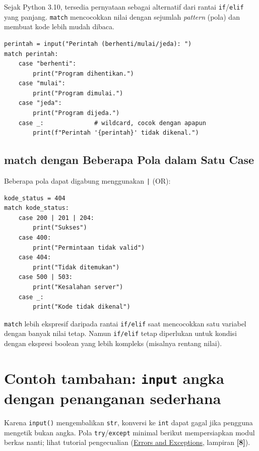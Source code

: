 ﻿\documentclass[../main.tex]{subfiles}
\begin{document}
Sejak Python 3.10, tersedia pernyataan  sebagai alternatif dari rantai \texttt{if}/\texttt{elif} yang panjang. \texttt{match} mencocokkan nilai dengan sejumlah \textit{pattern} (pola) dan membuat kode lebih mudah dibaca.

\begin{lstlisting}[caption=Pernyataan match dasar (Tutorial Python ss4.7)]
perintah = input("Perintah (berhenti/mulai/jeda): ")
match perintah:
    case "berhenti":
        print("Program dihentikan.")
    case "mulai":
        print("Program dimulai.")
    case "jeda":
        print("Program dijeda.")
    case _:              # wildcard, cocok dengan apapun
        print(f"Perintah '{perintah}' tidak dikenal.")
\end{lstlisting}

\subsection{match dengan Beberapa Pola dalam Satu Case}

Beberapa pola dapat digabung menggunakan \texttt{|} (OR):

\begin{lstlisting}[caption=Gabungan pola dengan OR]
kode_status = 404
match kode_status:
    case 200 | 201 | 204:
        print("Sukses")
    case 400:
        print("Permintaan tidak valid")
    case 404:
        print("Tidak ditemukan")
    case 500 | 503:
        print("Kesalahan server")
    case _:
        print("Kode tidak dikenal")
\end{lstlisting}

\begin{konsep}
\texttt{match} lebih ekspresif daripada rantai \texttt{if/elif} saat mencocokkan satu variabel dengan banyak nilai tetap. Namun \texttt{if/elif} tetap diperlukan untuk kondisi dengan ekspresi boolean yang lebih kompleks (misalnya rentang nilai).
\end{konsep}

\section{Contoh tambahan: \texttt{input} angka dengan penanganan sederhana}

\noindent Karena \texttt{input()} mengembalikan \texttt{str}, konversi ke \texttt{int} dapat gagal jika pengguna mengetik bukan angka. Pola \texttt{try}/\texttt{except} minimal berikut mempersiapkan modul berkas nanti; lihat tutorial pengecualian (\href{https://docs.python.org/3/tutorial/errors.html}{Errors and Exceptions}, lampiran \textbf{[8]}).
\end{document}
